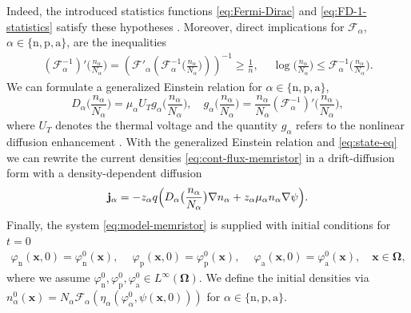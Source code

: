\documentclass[10pt,a4paper, final]{article}
\def\electrons{\text{n}}
\def\holes{\text{p}}
\def\ions{\text{a}}
\theoremstyle{definition}								%
\numberwithin{equation}{section}
\numberwithin{figure}{section}
\numberwithin{theorem}{section}
\begin{document}
Indeed, the introduced statistics functions \eqref{eq:Fermi-Dirac} and \eqref{eq:FD-1-statistics} satisfy these hypotheses \cite{Abdel.2023}.
Moreover, direct implications for $\mathcal{F}_\alpha$, $\alpha \in \{ \electrons, \holes, \ions \}$, are the inequalities
\begin{align} \label{eq:statistics-ineq}
        ( \mathcal{F}_\alpha^{-1} )' \bigl(\frac{n_\alpha}{N_\alpha} \bigr)
    = \left( \mathcal{F}'_\alpha \left( \mathcal{F}_\alpha^{-1} \bigl(\frac{n_\alpha}{N_\alpha} \bigr) \right) \right)^{-1} \geq \frac{1}{n},
    \quad
    ~
    \log\bigl(\frac{n_\alpha}{N_\alpha} \bigr) \leq\mathcal{F}_\alpha^{-1} \bigl(\frac{n_\alpha}{N_\alpha} \bigr).
\end{align}
We can formulate a generalized Einstein relation for $\alpha \in \{\electrons, \holes, \ions \}$,
\begin{equation} \label{eq:generalized-Einst-electric}
	D_\alpha\bigl(\frac{n_\alpha}{N_\alpha} \bigr) =\mu_\alpha U_T g_\alpha \bigl(\frac{n_\alpha}{N_\alpha} \bigr),
    \quad  g_\alpha \bigl(\frac{n_\alpha}{N_\alpha} \bigr)= \frac{n_\alpha}{N_\alpha} \left( \mathcal{F}_\alpha^{-1} \right)'\bigl(\frac{n_\alpha}{N_\alpha} \bigr),
\end{equation}
where $U_T$ denotes the thermal voltage and the quantity $g_\alpha$ refers to the nonlinear diffusion enhancement \cite{Abdel.2021}.
With the generalized Einstein relation and \eqref{eq:state-eq} we can rewrite the current densities \eqref{eq:cont-flux-memristor} in a drift-diffusion form with a density-dependent diffusion
\begin{align} \label{eq:fluxes-DD-form}
	\mathbf{j}_\alpha  = -z_\alpha q \Bigl( D_\alpha\bigl(\frac{n_\alpha}{N_\alpha} \bigr)  \nabla n_\alpha + z_\alpha \mu_\alpha n_\alpha \nabla \psi \Bigr).
\end{align}
Finally, the system \eqref{eq:model-memristor} is supplied with initial conditions for $t = 0$
\begin{align} \label{eq:initial-cond-memristor}
    \varphi_\electrons(\mathbf{x}, 0) = \varphi_\electrons^0(\mathbf{x}),
    ~
    \quad\varphi_\holes(\mathbf{x}, 0) = \varphi_\holes^0(\mathbf{x}),
    ~
    \quad \varphi_\ions(\mathbf{x}, 0) = \varphi_\ions^0(\mathbf{x}),
\quad  \mathbf{x} \in \boldsymbol{\Omega},
\end{align}
where we assume $\varphi_\electrons^0, \varphi_\holes^0, \varphi_\ions^0 \in L^{\infty}(\mathbf{\Omega})$.
We define the initial densities via $n_\alpha^0(\mathbf{x}) = N_\alpha\mathcal{F}_\alpha(\eta_\alpha(\varphi_\alpha^0,\psi(\mathbf{x},0)))$ for $\alpha \in \{ \electrons, \holes, \ions \}$.
\end{document}

